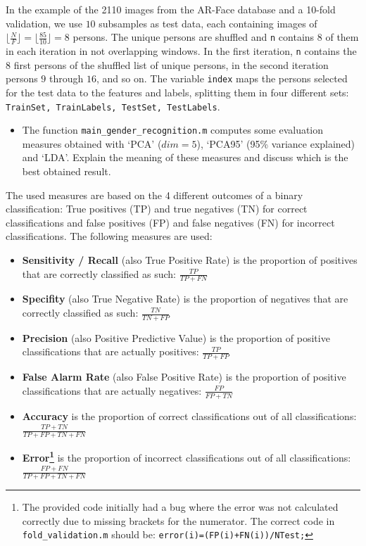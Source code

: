 In the example of the 2110 images from the AR-Face database and a 10-fold validation, we use $ 10 $ subsamples as test data, each containing images of  $ \lfloor\frac{N}{F}\rfloor = \lfloor\frac{85}{10}\rfloor = 8 $ persons. The unique persons are shuffled and \texttt{n} contains $ 8 $ of them in each iteration in not overlapping windows. In the first iteration, \texttt{n} contains the $ 8 $ first persons of the shuffled list of unique persons, in the second iteration persons $9$ through $16$, and so on. The variable \texttt{index} maps the persons selected for the test data to the features and labels, splitting them in four different sets: \texttt{TrainSet, TrainLabels, TestSet, TestLabels}.\newline

\question

\begin{itemize}
	\item The function \texttt{main\_gender\_recognition.m} computes some evaluation measures obtained with `PCA'
($ dim= 5 $), `PCA95' (95\% variance explained) and `LDA'. Explain the meaning of these measures and discuss which is the best obtained result.
\end{itemize} 

The used measures are based on the 4 different outcomes of a binary classification: True positives (TP) and true negatives (TN) for correct classifications and false positives (FP) and false negatives (FN) for incorrect classifications. The following measures are used:

\begin{itemize}
	\item \textbf{Sensitivity / Recall} (also True Positive Rate) is the proportion of positives that are correctly classified as such: $ \frac{TP}{TP + FN} $
	\item \textbf{Specifity} (also True Negative Rate) is the proportion of negatives that are correctly classified as such: $ \frac{TN}{TN + FP} $
	\item \textbf{Precision} (also Positive Predictive Value) is the proportion of positive classifications that are actually positives: $ \frac{TP}{TP + FP} $
	\item \textbf{False Alarm Rate} (also False Positive Rate) is the proportion of positive classifications that are actually negatives: $ \frac{FP}{FP + TN} $
	\item \textbf{Accuracy} is the proportion of correct classifications out of all classifications: $ \frac{TP + TN}{TP + FP + TN + FN} $
	\item \textbf{Error\footnote{The provided code initially had a bug where the error was not calculated correctly due to missing brackets for the numerator. The correct code in \texttt{fold\_validation.m} should be: \texttt{error(i)=(FP(i)+FN(i))/NTest;}}} is the proportion of incorrect classifications out of all classifications: $ \frac{FP + FN}{TP + FP + TN + FN} $
\end{itemize}

